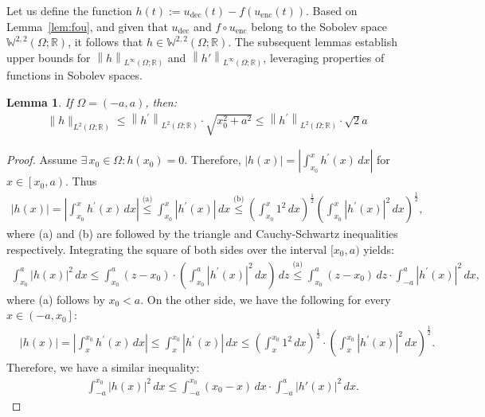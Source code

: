 \documentclass{article}
\newtheorem{lemma}{Lemma}
\def\encs{u_\textrm{enc}}
\def\decs{u_\textrm{dec}}
\newcommand{\norm}[1]{\left\lVert#1\right\rVert}
\newcommand{\lp}[1]{{L}^{#1}\left(\Omega; \mathbb{R}\right)}
\newcommand{\sob}[2]{\mathbb{W}^{#1,#2}\left(\Omega; \mathbb{R}\right)}
\newcommand{\lec}[2]{\stackrel{\text{#1}}{#2}}
\begin{document}
Let us define the function $h(t) := \decs(t) - f(\encs(t))$. Based on Lemma~\ref{lem:fou}, and given that $\decs$ and $f \circ \encs$ belong to the Sobolev space $\sob{2}{2}$, it follows that $h \in \sob{2}{2}$. The subsequent lemmas establish upper bounds for $\norm{h}_{\lp{\infty}}$ and $\norm{h'}_{\lp{\infty}}$, leveraging properties of functions in Sobolev spaces.
\begin{lemma}\label{lem:norm_infty_bound_1}
    If $\Omega=(-a, a)$, then:
\begin{align}
    \|h\|_{\lp{2}} \leqslant\left\|h^{\prime}\right\|_{\lp{2}} \cdot \sqrt{x_{0}^{2}+a^{2}} \leqslant\left\|h^{\prime}\right\|_{\lp{2}} \cdot \sqrt{2} a
\end{align}
\end{lemma}
\begin{proof}
Assume $\exists\, x_{0} \in \Omega: h\left(x_{0}\right)=0$. Therefore, $|h(x)|=\left|\int_{x_{0}}^{x} h^{\prime}(x)\,dx\right|$ for $x \in\left[x_{0}, a\right)$. Thus
\begin{align}
    |h(x)| =\left|\int_{x_{0}}^{x} h^{\prime}(x)\,dx\right| \lec{(a)}{\leqslant} \int_{x_{0}}^{x}\left|h^{\prime}(x)\right|\,dx \lec{(b)}{\leqslant} \left(\int_{x_{0}}^{x} 1^{2}\,dx\right)^{\frac{1}{2}}\left(\int_{x_{0}}^{x} |h^{\prime}(x)|^2\,dx\right)^{\frac{1}{2}},
\end{align}
where (a) and (b) are followed by the triangle and Cauchy-Schwartz inequalities respectively. Integrating the square of both sides over the interval $[x_0, a)$ yields:
\begin{align}\label{eq:norm_infty_bound_1}
 \int_{x_{0}}^{a}|h(x)|^{2}\,dx \lec{}{\leqslant} \int_{x_{0}}^{a}\left(z-x_{0}\right) \cdot \left( \int_{x_{0}}^{a}\left|h^{\prime}(x)\right|^{2} \,dx \right) \,dz \lec{(a)}{\leqslant} \int_{x_{0}}^{a}\left(z-x_{0}\right)\,dz \cdot \int_{-a}^{a}\left|h^{\prime}(x)\right|^{2}\,dx,
\end{align}
where (a) follows by $x_0 < a$. On the other side, we have the following for every $x \in\left(-a, x_{0}\right]$:
\begin{align}
& |h(x)|=\left|\int_{x}^{x_{0}} h^{\prime}(x)\,dx\right| \leqslant \int_{x}^{x_{0}}\left|h^{\prime}(x)\right|\,dx \leqslant\left(\int_{x}^{x_{0}} 1^{2}\,dx\right)^{\frac{1}{2}} \cdot\left(\int_{x}^{x_{0}}\left|h^{\prime}(x)\right|^{2}\,dx\right)^{\frac{1}{2}}.
\end{align}
Therefore, we have a similar inequality:
\begin{align}\label{eq:norm_infty_bound_2}
& \qquad \int_{-a}^{x_{0}}|h(x)|^{2}\,dx \leqslant \int_{-a}^{x_{0}}\left(x_{0}-x\right)\,dx \cdot \int_{-a}^{a}|h'(x)|^{2}\,dx.

\end{align}
\end{proof}
\end{document}
